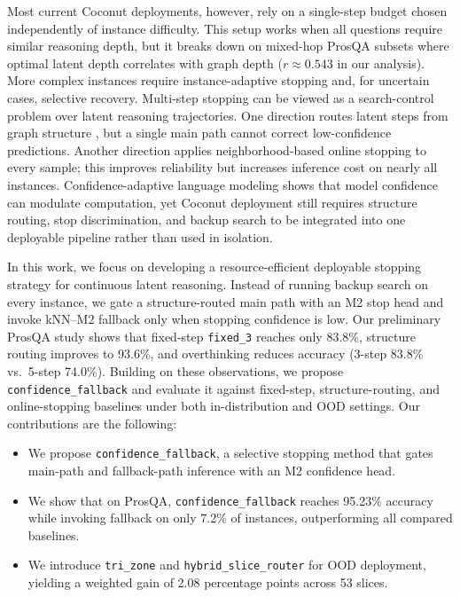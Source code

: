 \documentclass{article}
\begin{document}
Most current Coconut deployments, however, rely on a single-step budget chosen independently of instance difficulty. This setup works when all questions require similar reasoning depth, but it breaks down on mixed-hop ProsQA subsets where optimal latent depth correlates with graph depth ($r\approx0.543$ in our analysis). More complex instances require instance-adaptive stopping and, for uncertain cases, selective recovery. Multi-step stopping can be viewed as a search-control problem over latent reasoning trajectories. One direction routes latent steps from graph structure \citep{hao2024coconut,zhu2025superposition}, but a single main path cannot correct low-confidence predictions. Another direction applies neighborhood-based online stopping to every sample; this improves reliability but increases inference cost on nearly all instances. Confidence-adaptive language modeling \citep{schuster2022calm} shows that model confidence can modulate computation, yet Coconut deployment still requires structure routing, stop discrimination, and backup search to be integrated into one deployable pipeline rather than used in isolation.

In this work, we focus on developing a resource-efficient deployable stopping strategy for continuous latent reasoning. Instead of running backup search on every instance, we gate a structure-routed main path with an M2 stop head and invoke kNN--M2 fallback only when stopping confidence is low. Our preliminary ProsQA study shows that fixed-step \texttt{fixed\_3} reaches only 83.8\%, structure routing improves to 93.6\%, and overthinking reduces accuracy (3-step 83.8\% vs.\ 5-step 74.0\%). Building on these observations, we propose \texttt{confidence\_fallback} and evaluate it against fixed-step, structure-routing, and online-stopping baselines under both in-distribution and OOD settings. Our contributions are the following:
\begin{itemize}
\item We propose \texttt{confidence\_fallback}, a selective stopping method that gates main-path and fallback-path inference with an M2 confidence head.
\item We show that on ProsQA, \texttt{confidence\_fallback} reaches 95.23\% accuracy while invoking fallback on only 7.2\% of instances, outperforming all compared baselines.
\item We introduce \texttt{tri\_zone} and \texttt{hybrid\_slice\_router} for OOD deployment, yielding a weighted gain of 2.08 percentage points across 53 slices.
\end{itemize}
\end{document}
